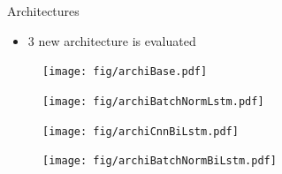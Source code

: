 \documentclass[xcolor=table]{beamer}
\begin{document}
\begin{frame}{Architectures}
    \begin{itemize}
        \item 3 new architecture is evaluated
    \end{itemize}
    \begin{center}
    \begin{figure}
        \texttt{[image: fig/archiBase.pdf]}
    \end{figure}\pause
    \begin{figure}
        \texttt{[image: fig/archiBatchNormLstm.pdf]}
    \end{figure}\pause
    \begin{figure}
        \texttt{[image: fig/archiCnnBiLstm.pdf]}
    \end{figure}\vspace{-0.3cm}\pause
    \begin{figure}
        \texttt{[image: fig/archiBatchNormBiLstm.pdf]}
    \end{figure}
    \end{center}
\end{frame}
\end{document}
